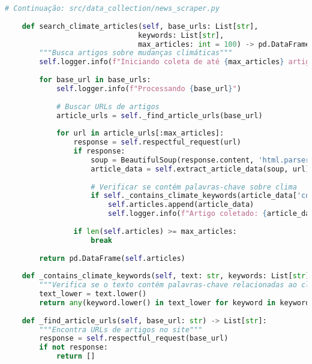 \begin{pythonbox}
\begin{lstlisting}[language=Python]
# Continuação: src/data_collection/news_scraper.py
    
    def search_climate_articles(self, base_urls: List[str], 
                               keywords: List[str], 
                               max_articles: int = 100) -> pd.DataFrame:
        """Busca artigos sobre mudanças climáticas"""
        self.logger.info(f"Iniciando coleta de até {max_articles} artigos")
        
        for base_url in base_urls:
            self.logger.info(f"Processando {base_url}")
            
            # Buscar URLs de artigos
            article_urls = self._find_article_urls(base_url)
            
            for url in article_urls[:max_articles]:
                response = self.respectful_request(url)
                if response:
                    soup = BeautifulSoup(response.content, 'html.parser')
                    article_data = self.extract_article_data(soup, url)
                    
                    # Verificar se contém palavras-chave sobre clima
                    if self._contains_climate_keywords(article_data['content'], keywords):
                        self.articles.append(article_data)
                        self.logger.info(f"Artigo coletado: {article_data['title'][:50]}...")
                        
                if len(self.articles) >= max_articles:
                    break
                    
        return pd.DataFrame(self.articles)
    
    def _contains_climate_keywords(self, text: str, keywords: List[str]) -> bool:
        """Verifica se o texto contém palavras-chave relacionadas ao clima"""
        text_lower = text.lower()
        return any(keyword.lower() in text_lower for keyword in keywords)
    
    def _find_article_urls(self, base_url: str) -> List[str]:
        """Encontra URLs de artigos no site"""
        response = self.respectful_request(base_url)
        if not response:
            return []
\end{lstlisting}
\end{pythonbox}

